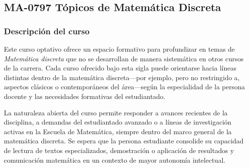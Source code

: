 \newpage
\subsection*{MA-0797 Tópicos de Matemática Discreta}

\hypertarget{MA0797}{}
\begin{refsection}
\begin{table}[H]
\end{table}

\subsubsection*{Descripción del curso}

Este curso optativo ofrece un espacio formativo para profundizar en temas de \emph{Matemática discreta} que no se desarrollan de manera sistemática en otros cursos de la carrera. Cada curso ofrecido bajo esta sigla puede orientarse hacia líneas distintas dentro de la matemática discreta---por ejemplo, pero no restringido a, aspectos clásicos o contemporáneos del área---según la especialidad de la persona docente y las necesidades formativas del estudiantado.

La naturaleza abierta del curso permite responder a avances recientes de la disciplina, a demandas del estudiantado avanzado o a líneas de investigación activas en la Escuela de Matemática, siempre dentro del marco general de la matemática discreta. Se espera que la persona estudiante consolide su capacidad de lectura de textos especializados, demostración o aplicación de resultados y comunicación matemática en un contexto de mayor autonomía intelectual.


\end{refsection}
